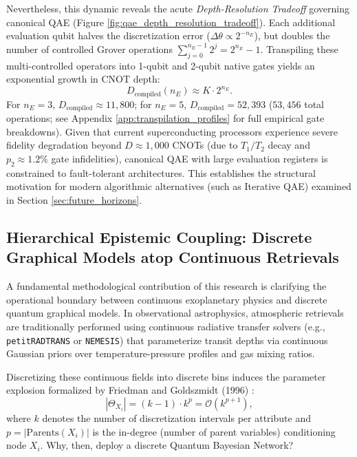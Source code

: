 Nevertheless, this dynamic reveals the acute \emph{Depth-Resolution Tradeoff} governing canonical QAE (Figure \ref{fig:qae_depth_resolution_tradeoff}). Each additional evaluation qubit halves the discretization error ($\Delta\theta \propto 2^{-n_E}$), but doubles the number of controlled Grover operations $\sum_{j=0}^{n_E-1} 2^j = 2^{n_E}-1$. Transpiling these multi-controlled operators into 1-qubit and 2-qubit native gates yields an exponential growth in CNOT depth:
\begin{equation}
D_{\mathrm{compiled}}(n_E) \approx K \cdot 2^{n_E}.
\end{equation}
For $n_E = 3$, $D_{\mathrm{compiled}} \approx 11,800$; for $n_E = 5$, $D_{\mathrm{compiled}} = 52,393$ ($53,456$ total operations; see Appendix \ref{app:transpilation_profiles} for full empirical gate breakdowns). Given that current superconducting processors experience severe fidelity degradation beyond $D \approx 1,000$ CNOTs (due to $T_1/T_2$ decay and $p_2 \approx 1.2\%$ gate infidelities), canonical QAE with large evaluation registers is constrained to fault-tolerant architectures. This establishes the structural motivation for modern algorithmic alternatives (such as Iterative QAE) examined in Section \ref{sec:future_horizons}.

\subsection{Hierarchical Epistemic Coupling: Discrete Graphical Models atop Continuous Retrievals}

A fundamental methodological contribution of this research is clarifying the operational boundary between continuous exoplanetary physics and discrete quantum graphical models. In observational astrophysics, atmospheric retrievals are traditionally performed using continuous radiative transfer solvers (e.g., \texttt{petitRADTRANS} or \texttt{NEMESIS}) that parameterize transit depths via continuous Gaussian priors over temperature-pressure profiles and gas mixing ratios.

Discretizing these continuous fields into discrete bins induces the parameter explosion formalized by Friedman and Goldszmidt (1996) \cite{friedman1996}:
\begin{equation}
|\Theta_{X_i}| = (k - 1) \cdot k^p = \mathcal{O}\left(k^{p+1}\right),
\end{equation}
where $k$ denotes the number of discretization intervals per attribute and $p = |\mathrm{Parents}(X_i)|$ is the in-degree (number of parent variables) conditioning node $X_i$. Why, then, deploy a discrete Quantum Bayesian Network?

